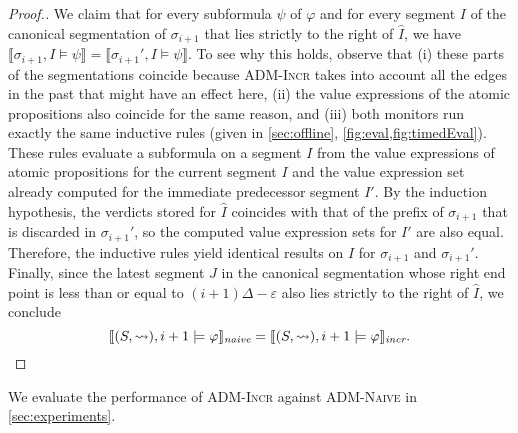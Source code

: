 \begin{proof}[\normalsize Proof.]
	We claim that for every subformula $\psi$ of $\varphi$ and for every segment $I$ of the canonical segmentation of $\sigma_{i+1}$ that lies strictly to the right of $\hat{I}$, we have $\llbracket \sigma_{i+1}, I \models \psi\rrbracket = \llbracket \sigma_{i+1}', I \models \psi \rrbracket$.
	To see why this holds, observe that (i) these parts of the segmentations coincide because \textsc{ADM-Incr} takes into account all the edges in the past that might have an effect here, (ii) the value expressions of the atomic propositions also coincide for the same reason, and (iii) both monitors run exactly the same inductive rules (given in \cref{sec:offline}, \cref{fig:eval,fig:timedEval}).
	These rules evaluate a subformula on a segment $I$ from the value expressions of atomic propositions for the current segment $I$ and the value expression set already computed for the immediate predecessor segment $I'$.
	By the induction hypothesis, the verdicts stored for $\hat{I}$ coincides with that of the prefix of $\sigma_{i+1}$ that is discarded in $\sigma_{i+1}'$, so the computed value expression sets for $I'$ are also equal.
	Therefore, the inductive rules yield identical results on $I$ for $\sigma_{i+1}$ and $\sigma_{i+1}'$.
	Finally, since the latest segment $J$ in the canonical segmentation whose right end point is less than or equal to $(i+1)\Delta - \varepsilon$ also lies strictly to the right of $\hat{I}$, we conclude
	$$\llbracket (S,\rightsquigarrow), i+1 \models \varphi \rrbracket_{\textit{naive}} = \llbracket (S,\rightsquigarrow), i+1 \models \varphi \rrbracket_{\textit{incr}}.$$
\end{proof}

We evaluate the performance of \textsc{ADM-Incr} against \textsc{ADM-Naive} in \cref{sec:experiments}.
\egroup





